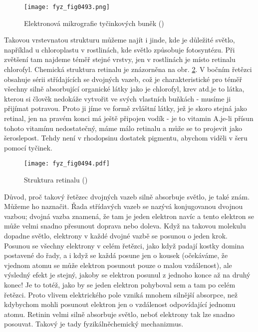     \begin{figure}[ht!] %
      \centering
      \texttt{[image: fyz\_fig0493.png]}
      \caption{Elektronová mikrografie tyčinkových buněk (\cite[s.~697]{Feynman01})}
      \label{fyz:fig0493}
    \end{figure}

    Takovou vrstevnatou strukturu můžeme najít i jinde, kde je důležité světlo, například u
    chloroplastu v rostlinách, kde světlo způsobuje fotosyntézu. Při zvětšení tam najdeme téměř
    stejné vrstvy, jen v rostlinách je místo retinalu chlorofyl. Chemická struktura retinalu je
    znázorněna na obr. \ref{fyz:fig0494}. V bočním řetězci obsahuje sérii střídajících se dvojných
    vazeb, což je charakteristické pro téměř všechny silně absorbující organické látky jako je
    chlorofyl, krev atd.je to látka, kterou si člověk nedokáže vytvořit ve svých vlastních buňkách -
    musíme ji přijímat potravou. Proto ji jíme ve formě zvláštní látky, jež je skoro stejná jako
    retinal, jen na pravém konci má ještě připojen vodík - je to vitamin A.je-li přísun tohoto
    vitamínu nedostatečný, máme málo retinalu a může se to projevit jako šeroslepost. Tehdy není v
    rhodopsinu dostatek pigmentu, abychom viděli v šeru pomocí tyčinek.

    \begin{figure}[ht!] %
      \centering
      \texttt{[image: fyz\_fig0494.pdf]}
      \caption{Struktura retinalu (\cite[s.~697]{Feynman01})}
      \label{fyz:fig0494}
    \end{figure}

    Důvod, proč takový řetězec dvojných vazeb silně absorbuje světlo, je také znám. Můžeme ho
    naznačit. Řada střídavých vazeb se nazývá konjugovanou dvojnou vazbou; dvojná vazba znamená, že
    tam je jeden elektron navíc a tento elektron se může velmi snadno přesunout doprava nebo doleva.
    Když na takovou molekulu dopadne světlo, elektrony v každé dvojné vazbě se posunou o jeden krok.
    Posunou se všechny elektrony v celém řetězci, jako když padají kostky domina postavené do řady,
    a i když se každá posune jen o kousek (očekáváme, že vjednom atomu se může elektron posunout
    pouze o malou vzdálenost), ale výsledný efekt je stejný, jakoby se elektron posunul z jednoho
    konce až na druhý konec! Je to totéž, jako by se jeden elektron pohyboval sem a tam po celém
    řetězci. Proto vlivem elektrického pole vzniká mnohem silnější absorpce, než kdybychom mohli
    posunout elektron jen o vzdálenost odpovídající jednomu atomu. Retinin velmi silně absorbuje
    světlo, neboť elektrony tak lze snadno posouvat. Takový je tady fyzikálněchemický mechanizmus.

